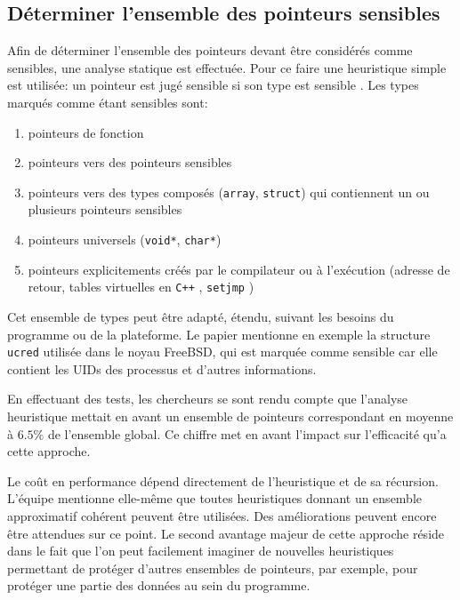 \subsection{Déterminer l'ensemble des pointeurs sensibles}

Afin de déterminer l'ensemble des pointeurs devant être considérés comme sensibles, une analyse statique est effectuée. Pour ce faire une heuristique simple est utilisée: \og un pointeur est jugé sensible si son type est sensible \fg. Les types marqués comme étant sensibles sont:

\begin{enumerate}
	\item pointeurs de fonction
	\item pointeurs vers des pointeurs sensibles
	\item pointeurs vers des types composés (\texttt{array}, \texttt{struct}) qui contiennent un ou plusieurs pointeurs sensibles
	\item pointeurs universels (\texttt{void*}, \texttt{char*})
  \item pointeurs explicitements créés par le compilateur ou à l'exécution (adresse de retour, tables virtuelles en \texttt{C++} \cite{fonctionsVirtuelles}, \texttt{setjmp} \cite{setjmp})
\end{enumerate}

Cet ensemble de types peut être adapté, étendu, suivant les besoins du programme ou de la plateforme. Le papier mentionne en exemple la structure \texttt{ucred} utilisée dans le noyau FreeBSD, qui est marquée comme sensible car elle contient les UIDs des processus et d'autres informations.

En effectuant des tests, les chercheurs se sont rendu compte que l'analyse heuristique mettait en avant un ensemble de pointeurs correspondant en moyenne à $6.5\%$ de l'ensemble global. Ce chiffre met en avant l'impact sur l'efficacité qu'a cette approche.

Le coût en performance dépend directement de l'heuristique et de sa récursion. L'équipe mentionne elle-même que toutes heuristiques donnant un ensemble approximatif cohérent peuvent être utilisées. Des améliorations peuvent encore être attendues sur ce point. Le second avantage majeur de cette approche réside dans le fait que l'on peut facilement imaginer de nouvelles heuristiques permettant de protéger d'autres ensembles de pointeurs, par exemple, pour protéger une partie des données au sein du programme.

